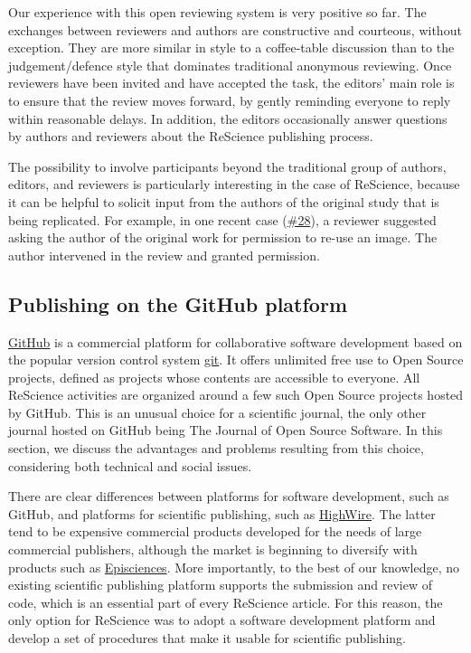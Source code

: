 \documentclass[11pt]{article}
\begin{document}
Our experience with this open reviewing system is very positive so
far. The exchanges between reviewers and authors are constructive and
courteous, without exception. They are more similar in style to a
coffee-table discussion than to the judgement/defence style that
dominates traditional anonymous reviewing. Once reviewers have been
invited and have accepted the task, the editors' main role is to
ensure that the review moves forward, by gently reminding everyone to
reply within reasonable delays. In addition, the editors occasionally
answer questions by authors and reviewers about the ReScience
publishing process.

The possibility to involve participants beyond the traditional group of
authors, editors, and reviewers is particularly interesting in the
case of ReScience, because it can be helpful to solicit input from the
authors of the original study that is being replicated. For example,
in one recent case
(\href{https://github.com/ReScience/ReScience-submission/pull/28}{\#28}),
a reviewer suggested asking the author of the original work for
permission to re-use an image. The author intervened in the review and
granted permission.

\subsection*{Publishing on the GitHub platform}

\href{http://github.com/}{GitHub} is a commercial platform for collaborative
software development based on the popular version control system
\href{https://git-scm.com/}{git}. It offers unlimited free use to Open Source
projects, defined as projects whose contents are accessible to everyone. All
ReScience activities are organized around a few such Open Source projects
hosted by GitHub. This is an unusual choice for a scientific journal, the only
other journal hosted on GitHub being The Journal of Open Source
Software\citep{Smith:2017}. In this section, we discuss the advantages and
problems resulting from this choice, considering both technical and social
issues.

There are clear differences between platforms for software
development, such as GitHub, and platforms for scientific publishing,
such as \href{http://home.highwire.org/}{HighWire}. The latter tend to
be expensive commercial products developed for the needs of large
commercial publishers, although the market is beginning to diversify
with products such as
\href{https://www.episciences.org/}{Episciences}.  More importantly,
to the best of our knowledge, no existing scientific publishing
platform supports the submission and review of code, which is an
essential part of every ReScience article. For this reason, the only
option for ReScience was to adopt a software development platform and
develop a set of procedures that make it usable for scientific
publishing.
\end{document}
